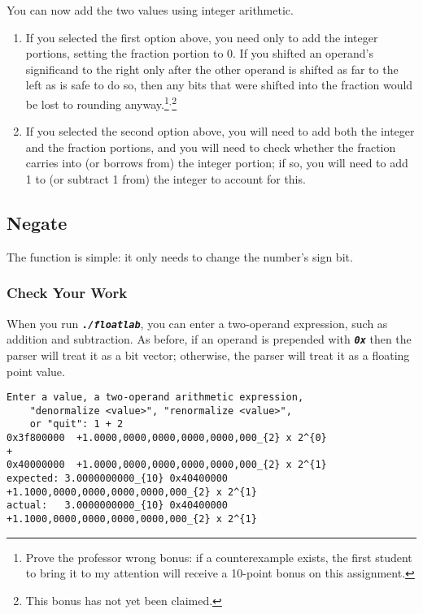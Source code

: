 You can now add the two values using integer arithmetic.

\begin{enumerate}
    \item If you selected the first option above, you need only to add the integer portions, setting the fraction portion to 0.
        If you shifted an operand's significand to the right only after the other operand is shifted as far to the left as is safe to do so, then any bits that were shifted into the fraction would be lost to rounding anyway.\footnote{
            Prove the professor wrong bonus: if a counterexample exists, the first student to bring it to my attention will receive a 10-point bonus on this assignment.
        }$^{,}$\footnote{
            This bonus has not yet been claimed.
        }
    \item If you selected the second option above, you will need to add both the integer and the fraction portions,
        and you will need to check whether the fraction carries into (or borrows from) the integer portion;
        if so, you will need to add 1 to (or subtract 1 from) the integer to account for this.
\end{enumerate}

\subsection{Negate}

The  function is simple: it only needs to change the number's sign bit.

\subsubsection*{Check Your Work}

When you run \texttt{\textbf{\textit{./floatlab}}}, you can enter a two-operand expression, such as addition and subtraction.
As before, if an operand is prepended with \texttt{\textbf{\textit{0x}}} then the parser will treat it as a bit vector;
otherwise, the parser will treat it as a floating point value.

\begin{verbatim}
Enter a value, a two-operand arithmetic expression,
    "denormalize <value>", "renormalize <value>",
    or "quit": 1 + 2
0x3f800000	+1.0000,0000,0000,0000,0000,000_{2} x 2^{0}
+
0x40000000	+1.0000,0000,0000,0000,0000,000_{2} x 2^{1}
expected: 3.0000000000_{10}	0x40400000	+1.1000,0000,0000,0000,0000,000_{2} x 2^{1}
actual:   3.0000000000_{10}	0x40400000	+1.1000,0000,0000,0000,0000,000_{2} x 2^{1}
\end{verbatim}

